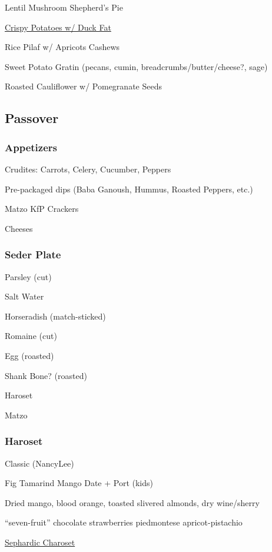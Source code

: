 \begin{centering}
 Lentil \And Mushroom Shepherd's Pie

 \href{http://www.seriouseats.com/recipes/2011/11/ultra-crispy-roast-potatoes-recipe.html}{Crispy Potatoes w/ Duck Fat}

 Rice Pilaf w/ Apricots \And Cashews

 Sweet Potato Gratin (pecans, cumin, breadcrumbs/butter/cheese?, sage)

 Roasted Cauliflower w/ Pomegranate Seeds

 \subsection*{Passover}

 \subsubsection*{Appetizers}
 Crudites: Carrots, Celery, Cucumber, Peppers

 Pre-packaged dips (Baba Ganoush, Hummus, Roasted Peppers, etc.)

 Matzo \And KfP Crackers

 Cheeses

 \subsubsection*{Seder Plate}
 Parsley (cut)

 Salt Water

 Horseradish (match-sticked)

 Romaine (cut)

 Egg (roasted)

 Shank Bone? (roasted)

 Haroset

 Matzo

 \subsubsection*{Haroset}
 Classic (NancyLee)

 Fig \blt Tamarind \blt Mango \blt Date + Port (kids)

 Dried mango, blood orange, toasted slivered almonds, dry wine/sherry

 “seven-fruit” \blt chocolate \And strawberries \blt piedmontese \blt apricot-pistachio

 \href{https://www.seriouseats.com/2012/04/how-to-make-sephardic-charoset-haroset-dried-fruit-recipe-passover.html}{Sephardic Charoset}


\end{centering}
